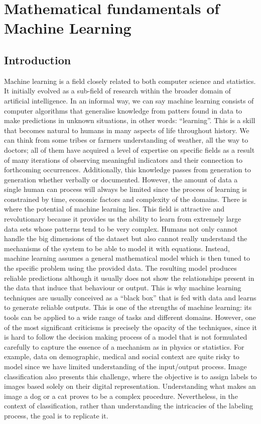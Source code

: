 
\chapter{Mathematical fundamentals of Machine Learning}\label{ch:1-MathematicalFundamentalsML}


\section{Introduction}
Machine learning is a field closely related to both computer science and statistics. It initially evolved as a sub-field of research within the broader domain of artificial intelligence. In an informal way, we can say machine learning consists of computer algorithms that generalise knowledge from patters found in data to make predictions in unknown situations, in other words: ``learning''. This is a skill that becomes natural to humans in many aspects of life throughout history. We can think from some tribes or farmers understanding of weather, all the way to doctors; all of them have acquired a level of expertise on specific fields as a result of many iterations of observing meaningful indicators and their connection to forthcoming occurrences. Additionally, this knowledge passes from generation to generation whether verbally or documented.  However, the amount of data a single human can process will always be limited since the process of learning is constrained by time, economic factors and complexity of the domains. There is where the potential of machine learning lies. This field is attractive and revolutionary because it provides us the ability to learn from extremely large data sets whose patterns tend to be very complex. Humans not only cannot handle the big dimensions of the dataset but also cannot really understand the mechanisms of the system to be able to model it with equations. Instead, machine learning assumes a general mathematical model which is then tuned to the specific problem using the provided data. The resulting model produces reliable predictions although it usually does not show the relationships present in the data that induce that behaviour or output. This is why machine learning techniques are usually conceived as a ``black box'' that is fed with data and learns to generate reliable outputs. This is one of the strengths of machine learning: its tools can be applied to a wide range of tasks and different domains. However, one of the most significant criticisms is precisely the opacity of the techniques, since it is hard to follow the decision making process of a model that is not formulated carefully to capture the essence of a mechanism as in physics or statistics. For example, data on demographic, medical and social context are quite risky  to model since we have limited understanding of the input/output process. Image classification also presents this challenge, where the objective is to assign labels to images based solely on their digital representation. Understanding what makes an image a dog or a cat proves to be a complex procedure. Nevertheless, in the context of classification, rather than understanding the intricacies of the labeling process, the goal is to replicate it.

